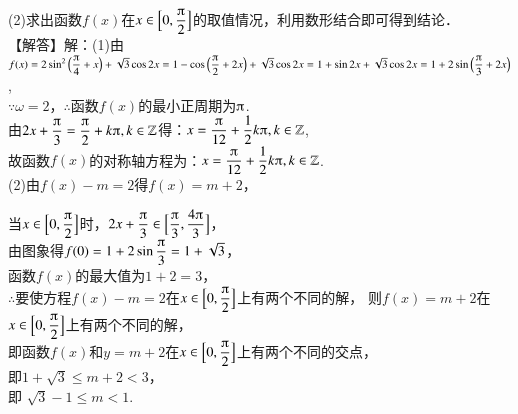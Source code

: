 \begin{exercise}
\begin{answer}
        (2)求出函数$f(x)$在$x\in\Bigl[0,\dfrac{\piup}2\Bigr]$的取值情况，利用数形结合即可得到结论．\\
        【解答】解：(1)由$f(x)=2\sin^2{\Bigl(\dfrac{\piup}4+x\Bigr)}+\sqrt3\cos{2x}
        =1-\cos{\Bigl(\dfrac{\piup}2+2x\Bigr)}+\sqrt3\cos{2x}
        =1+\sin{2x}+\sqrt3\cos{2x}=1+2\sin{\Bigl(\dfrac{\piup}3+2x\Bigr)}$,\\
        $\because \omega=2$，$\therefore$函数$f(x)$的最小正周期为$\piup$.\\
        由$2x+\dfrac{\piup}3=\dfrac{\piup}2+k\piup,k\in\mathbb{Z}$得：$x=\dfrac{\piup}{12}+\dfrac12k\piup,{k\in\mathbb{Z}}$,\\
        故函数$f(x)$的对称轴方程为：$x=\dfrac{\piup}{12}+\dfrac12k\piup,{k\in\mathbb{Z}}$.\\
        (2)由$f(x)-m=2$得$f(x)=m+2$，\\
        当${x\in\Bigl[0,\dfrac{\piup}2\Bigr]}$时，$2x+\dfrac{\piup}3\in\Bigl[\dfrac{\piup}3,\dfrac{4\piup}3\Bigr]$，\\
        由图象得$f(0)=1+2\sin{\dfrac{\piup}3}=1+\sqrt3$，\\
        函数$f(x)$的最大值为$1+2=3$，\\
        $\therefore$要使方程$f(x)-m=2$在$x\in\Bigl[0,\dfrac{\piup}2\Bigr]$上有两个不同的解，
        则$f(x)=m+2$在$x\in\Bigl[0,\dfrac{\piup}2\Bigr]$上有两个不同的解，\\
        即函数$f(x)$和$y=m+2$在$x\in\Bigl[0,\dfrac{\piup}2\Bigr]$上有两个不同的交点，\\
        即$1+\sqrt3\leqslant m+2<3$，\\
        即 $\sqrt3-1\leqslant m<1$.
      \end{answer}
    \item

\end{exercise}
